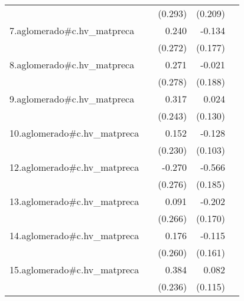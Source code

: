 {\begin{longtable}{l*{4}{D{.}{.}{-1}}}
            &                     &     (0.293)         &     (0.209)         &                     \\
\addlinespace
7.aglomerado#c.hv\_matpreca&                     &       0.240         &      -0.134         &                     \\
            &                     &     (0.272)         &     (0.177)         &                     \\
\addlinespace
8.aglomerado#c.hv\_matpreca&                     &       0.271         &      -0.021         &                     \\
            &                     &     (0.278)         &     (0.188)         &                     \\
\addlinespace
9.aglomerado#c.hv\_matpreca&                     &       0.317         &       0.024         &                     \\
            &                     &     (0.243)         &     (0.130)         &                     \\
\addlinespace
10.aglomerado#c.hv\_matpreca&                     &       0.152         &      -0.128         &                     \\
            &                     &     (0.230)         &     (0.103)         &                     \\
\addlinespace
12.aglomerado#c.hv\_matpreca&                     &      -0.270         &      -0.566\sym{**} &                     \\
            &                     &     (0.276)         &     (0.185)         &                     \\
\addlinespace
13.aglomerado#c.hv\_matpreca&                     &       0.091         &      -0.202         &                     \\
            &                     &     (0.266)         &     (0.170)         &                     \\
\addlinespace
14.aglomerado#c.hv\_matpreca&                     &       0.176         &      -0.115         &                     \\
            &                     &     (0.260)         &     (0.161)         &                     \\
\addlinespace
15.aglomerado#c.hv\_matpreca&                     &       0.384         &       0.082         &                     \\
            &                     &     (0.236)         &     (0.115)         &                     \\

\end{longtable}}

